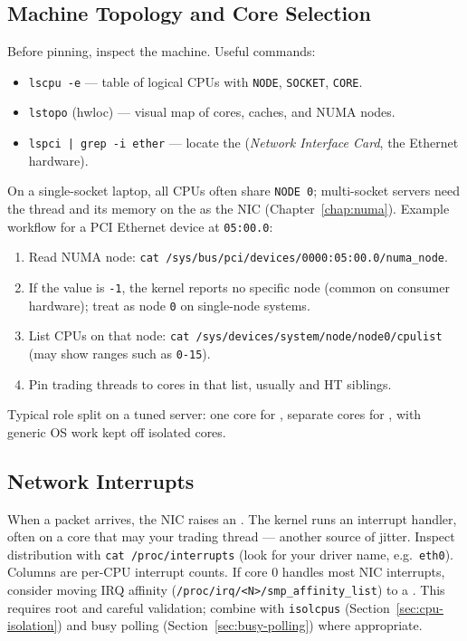 \subsection[Topology]{Machine Topology and Core Selection}
\label{subsec:cpu-topology}
Before pinning, inspect the machine. Useful commands:
\begin{itemize}
    \item \texttt{lscpu -e} --- table of logical CPUs with \texttt{NODE}, \texttt{SOCKET}, \texttt{CORE}.
    \item \texttt{lstopo} (hwloc) --- visual map of cores, caches, and NUMA nodes.
    \item \texttt{lspci | grep -i ether} --- locate the  
          (\emph{Network Interface Card}, the Ethernet hardware).
\end{itemize}
On a single-socket laptop, all CPUs often share \texttt{NODE 0}; multi-socket servers need the thread 
and its memory on the  as the NIC (Chapter~\ref{chap:numa}).
\newline
Example workflow for a PCI Ethernet device at \texttt{05:00.0}:
\begin{enumerate}
    \item Read NUMA node: \texttt{cat /sys/bus/pci/devices/0000:05:00.0/numa\_node}.
    \item If the value is \texttt{-1}, the kernel reports no specific node (common on consumer hardware); 
          treat as node \texttt{0} on single-node systems.
    \item List CPUs on that node: \texttt{cat /sys/devices/system/node/node0/cpulist} 
          (may show ranges such as \texttt{0-15}).
    \item Pin trading threads to cores in that list, usually  and HT siblings.
\end{enumerate}
Typical role split on a tuned server: one core for , separate cores for 
, with generic OS work kept off isolated cores.

\subsection[IRQ Overview]{Network Interrupts}
\label{subsec:irq-affinity-overview}
When a packet arrives, the NIC raises an . The kernel runs an interrupt 
handler, often on a core that may  your trading thread --- another source of jitter.
\newline
Inspect distribution with \texttt{cat /proc/interrupts} (look for your driver name, e.g.\ \texttt{eth0}). 
Columns are per-CPU interrupt counts. If core 0 handles most NIC interrupts, consider moving IRQ affinity 
(\texttt{/proc/irq/<N>/smp\_affinity\_list}) to a . 
This requires root and careful validation; combine with \texttt{isolcpus} (Section~\ref{sec:cpu-isolation}) 
and busy polling (Section~\ref{sec:busy-polling}) where appropriate.

